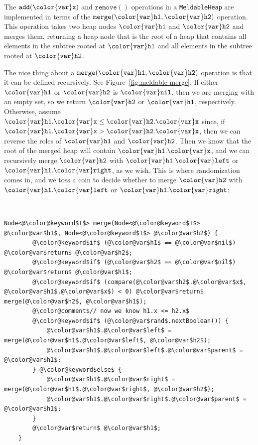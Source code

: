 \documentclass[10pt]{book}
\newcommand{\figref}[1]{Figure~\ref{fig:#1}}
\theoremstyle{plain}
\theoremstyle{definition}
\begin{document}
The \ensuremath{\mathtt{add({\color{var}x})}} and \ensuremath{\mathtt{remove()}} operations in a \texttt{MeldableHeap} are
implemented in terms of the \ensuremath{\mathtt{merge({\color{var}h1},{\color{var}h2})}} operation.  This operation
takes two heap nodes \ensuremath{\mathtt{{\color{var}h1}}} and \ensuremath{\mathtt{{\color{var}h2}}} and merges them, returning a heap
node that is the root of a heap that contains all elements in the subtree
rooted at \ensuremath{\mathtt{{\color{var}h1}}} and all elements in the subtree rooted at \ensuremath{\mathtt{{\color{var}h2}}}.

The nice thing about a \ensuremath{\mathtt{merge({\color{var}h1},{\color{var}h2})}} operation is that it can be
defined recursively. See \figref{meldable-merge}.  If either \ensuremath{\mathtt{{\color{var}h1}}} or
\ensuremath{\mathtt{{\color{var}h2}}} is \ensuremath{\mathtt{{\color{var}nil}}}, then we are merging with an empty set, so we return \ensuremath{\mathtt{{\color{var}h2}}}
or \ensuremath{\mathtt{{\color{var}h1}}}, respectively.  Otherwise, assume $\ensuremath{\mathtt{{\color{var}h1}.{\color{var}x}}} \le \ensuremath{\mathtt{{\color{var}h2}.{\color{var}x}}}$ since,
if $\ensuremath{\mathtt{{\color{var}h1}.{\color{var}x}}} > \ensuremath{\mathtt{{\color{var}h2}.{\color{var}x}}}$, then we can reverse the roles of \ensuremath{\mathtt{{\color{var}h1}}} and \ensuremath{\mathtt{{\color{var}h2}}}.
Then we know that the root of the merged heap will contain \ensuremath{\mathtt{{\color{var}h1}.{\color{var}x}}}, and
we can recursively merge \ensuremath{\mathtt{{\color{var}h2}}} with \ensuremath{\mathtt{{\color{var}h1}.{\color{var}left}}} or \ensuremath{\mathtt{{\color{var}h1}.{\color{var}right}}}, as we wish.
This is where randomization comes in, and we toss a coin to decide
whether to merge \ensuremath{\mathtt{{\color{var}h2}}} with \ensuremath{\mathtt{{\color{var}h1}.{\color{var}left}}} or \ensuremath{\mathtt{{\color{var}h1}.{\color{var}right}}}:


 \ \vspace{.5ex}\begin{Verbatim}[gobble=1,tabsize=2,frame=single,framerule=1.2pt,commandchars=\\@\$,label=\texttt{MeldableHeap},labelposition=topline]
	Node<@\color@keyword$T$> merge(Node<@\color@keyword$T$> @\color@var$h1$, Node<@\color@keyword$T$> @\color@var$h2$) {
		@\color@keyword$if$ (@\color@var$h1$ == @\color@var$nil$) @\color@var$return$ @\color@var$h2$;
		@\color@keyword$if$ (@\color@var$h2$ == @\color@var$nil$) @\color@var$return$ @\color@var$h1$;
		@\color@keyword$if$ (compare(@\color@var$h2$.@\color@var$x$, @\color@var$h1$.@\color@var$x$) < 0) @\color@var$return$ merge(@\color@var$h2$, @\color@var$h1$);
		@\color@comment$// now we know h1.x <= h2.x$
		@\color@keyword$if$ (@\color@var$rand$.nextBoolean()) {
			@\color@var$h1$.@\color@var$left$ = merge(@\color@var$h1$.@\color@var$left$, @\color@var$h2$);
			@\color@var$h1$.@\color@var$left$.@\color@var$parent$ = @\color@var$h1$;
		} @\color@keyword$else$ {
			@\color@var$h1$.@\color@var$right$ = merge(@\color@var$h1$.@\color@var$right$, @\color@var$h2$);
			@\color@var$h1$.@\color@var$right$.@\color@var$parent$ = @\color@var$h1$;
		}
		@\color@var$return$ @\color@var$h1$;
	}
\end{Verbatim}
\end{document}
